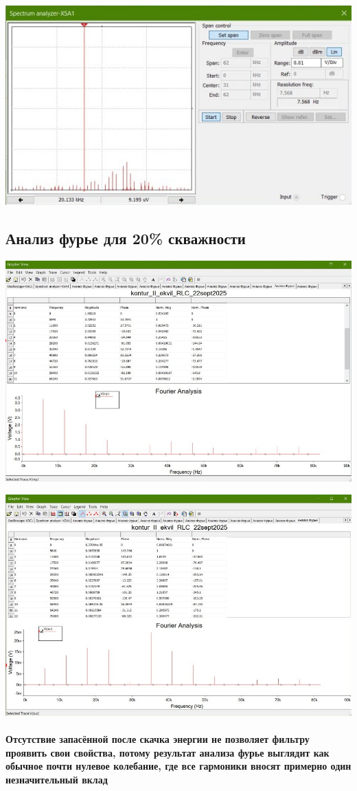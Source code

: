 \documentclass[12pt,a4paper]{article}
\begin{document}
	\includegraphics[width=0.7\linewidth]{src/spectr_2}
	
	\newpage
	
	\subsection*{Анализ фурье для 20\% скважности}
	
	\includegraphics[width=0.7\linewidth]{src/fourier_in_20}
	
	\medskip
	\medskip
	\medskip
	\medskip
	\medskip
		
	\includegraphics[width=0.7\linewidth]{src/fourier_out_20}

	\paragraph*{Отсутствие запасённой после скачка энергии не позволяет фильтру проявить свои свойства, потому результат анализа фурье выглядит как обычное почти нулевое колебание, где все гармоники вносят примерно один незначительный вклад}
	
\end{document}
